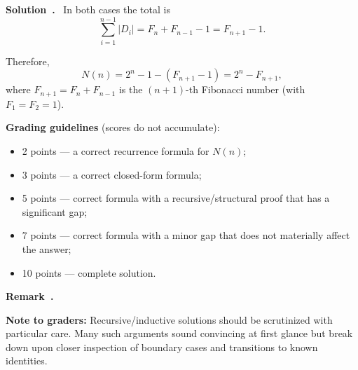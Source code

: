 \documentclass[a4paper,12pt]{article}
\newenvironment{solution}[1][]{%
  \goodbreak\smallskip\par\noindent\textbf{Solution\if\relax\detokenize{#1}\relax\else~#1\fi.}~}%
{%
  \goodbreak
}
\newenvironment{remark}[1][]{
  \goodbreak\smallskip\par
  \small
  \noindent\textbf{Remark\if\relax\detokenize{#1}\relax\else~#1\fi.}~%
}{%
  \goodbreak
  \normalsize
}
\begin{document}
\begin{solution}
In both cases the total is
\[
  \sum_{i=1}^{n-1} |D_i| = F_n + F_{n-1} - 1 = F_{n+1} - 1.
\]

Therefore,
\[
  \boxed{N(n) = 2^n - 1 - (F_{n+1} - 1) = 2^n - F_{n+1}},
\]
where $F_{n+1} = F_n + F_{n-1}$ is the $(n{+}1)$-th Fibonacci number (with $F_1 = F_2 = 1$).

\medskip
\textbf{Grading guidelines} (scores do not accumulate):
\begin{itemize}
  \item 2 points --- a correct recurrence formula for $N(n)$;
  \item 3 points --- a correct closed-form formula;
  \item 5 points --- correct formula with a recursive/structural proof that has a significant gap;
  \item 7 points --- correct formula with a minor gap that does not materially affect the answer;
  \item 10 points --- complete solution.
\end{itemize}

\smallskip
\begin{remark}
    \textbf{Note to graders:}
    Recursive/inductive solutions should be scrutinized with particular care.
    Many such arguments sound convincing at first glance but break down
    upon closer inspection of boundary cases and transitions to known identities.
\end{remark}

\end{solution}

\end{document}
